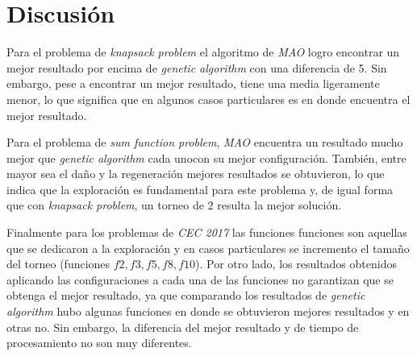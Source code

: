 \section{Discusión}

Para el problema de \textit{knapsack problem} el algoritmo de \textit{MAO} logro encontrar un mejor resultado por encima de \textit{genetic algorithm} con una diferencia de 5. Sin embargo, pese a encontrar un mejor resultado, tiene una media ligeramente menor, lo que significa que en algunos casos particulares es en donde encuentra el mejor resultado. 

Para el problema de \textit{sum function problem}, \textit{MAO} encuentra un resultado mucho mejor que \textit{genetic algorithm} cada unocon su mejor configuración. También, entre mayor sea el daño y la regeneración mejores resultados se obtuvieron, lo que indica que la exploración es fundamental para este problema y, de igual forma que con \textit{knapsack problem}, un torneo de 2 resulta la mejor solución.

Finalmente para los problemas de \textit{CEC 2017} las funciones funciones son aquellas que se dedicaron a la exploración y en casos particulares se incremento el tamaño del torneo (funciones $f2, f3, f5, f8, f10$). Por otro lado, los resultados obtenidos aplicando las configuraciones a cada una de las funciones no garantizan que se obtenga el mejor resultado, ya que comparando los resultados de \textit{genetic algorithm} hubo algunas funciones en donde se obtuvieron mejores resultados y en otras no. Sin embargo, la diferencia del mejor resultado y de tiempo de procesamiento no son muy diferentes.

